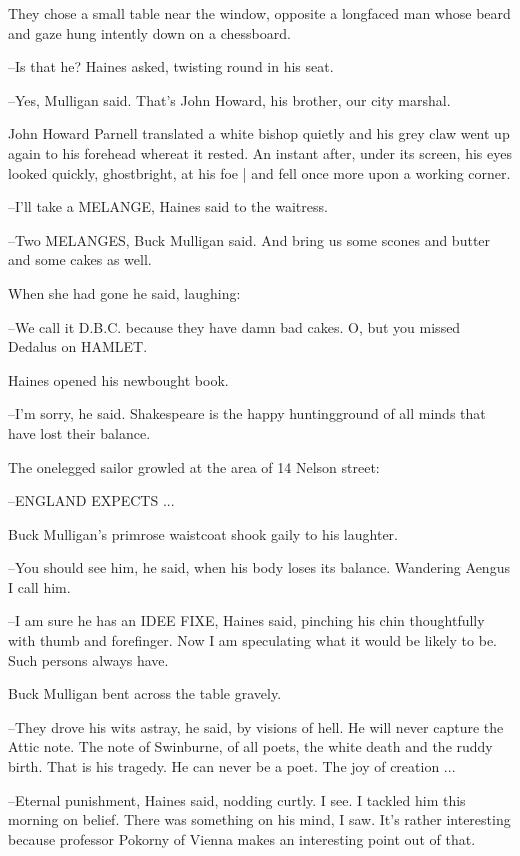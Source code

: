 They chose a small table near the window,
opposite a longfaced man
whose beard and gaze hung intently down on a chessboard.

--Is that he?
Haines asked,
twisting round in his seat.

--Yes,
Mulligan said.
That's John Howard, his brother, our city marshal.

John Howard Parnell translated a white bishop quietly
and his grey claw went up again to his forehead
whereat it rested.
An instant after,
under its screen,
his eyes looked quickly, ghostbright, at his foe |
and fell once more upon a working corner.

--I'll take a MELANGE,
Haines said to the waitress.

--Two MELANGES,
Buck Mulligan said.
And bring us some scones and butter
and some cakes as well.

When she had gone
he said, laughing:

--We call it D.B.C. because they have damn bad cakes.
O, but you missed
Dedalus on HAMLET.

Haines opened his newbought book.%

--I'm sorry,
he said.
Shakespeare is the happy huntingground of all minds
that have lost their balance.

The onelegged sailor growled at the area of 14 Nelson street:

--ENGLAND EXPECTS ...

Buck Mulligan's primrose waistcoat shook gaily to his laughter.

--You should see him,
he said,
when his body loses its balance.
Wandering
Aengus I call him.

--I am sure he has an IDEE FIXE,
Haines said,
pinching his chin thoughtfully with thumb and forefinger.
Now I am speculating what it would be likely to be.
Such persons always have.

Buck Mulligan bent across the table gravely.

--They drove his wits astray,
he said,
by visions of hell.
He will never
capture the Attic note.
The note of Swinburne,
of all poets,
the white
death and the ruddy birth.
That is his tragedy.
He can never be a poet.
The joy of creation ...

--Eternal punishment,
Haines said,
nodding curtly.
I see.
I tackled him
this morning on belief.
There was something on his mind, I saw.
It's
rather interesting
because professor Pokorny of Vienna makes an
interesting point out of that.

